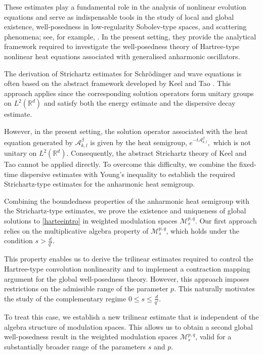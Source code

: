 \documentclass[12pt,reqno,a4paper]{amsart}
\numberwithin{equation}{section}
\theoremstyle{plain}
\theoremstyle{definition}
\theoremstyle{remark}
\def\M{\mathcal{M}}
\def \Ad{\mathcal{A}_{k,l}}
\def \M{{\mathcal M}}
\begin{document}
These estimates play a fundamental role in the analysis of nonlinear evolution equations and serve as indispensable tools in the study of local and global existence, well-posedness in low-regularity Sobolev-type spaces, and scattering phenomena; see, for example, \cite{MR2257393, MR1778778, MR2195116}. In the present setting, they provide the analytical framework required to investigate the well-posedness theory of Hartree-type nonlinear heat equations associated with generalised anharmonic oscillators.

The derivation of Strichartz estimates for Schr\"odinger and wave equations is often based on the abstract framework developed by Keel and Tao \cite{MR1646048}. This approach applies since the corresponding solution operators form unitary groups on $L^{2}(\mathbb{R}^{d})$ and satisfy both the energy estimate and the dispersive decay estimate.

However, in the present setting, the solution operator associated with the heat equation generated by $\Ad^{\beta}$ is given by the heat semigroup, $e^{-t\Ad^{\beta}},$ which is not unitary on $L^{2}(\mathbb{R}^{d})$. Consequently, the abstract Strichartz theory of Keel and Tao cannot be applied directly. To overcome this difficulty, we combine the fixed-time dispersive estimates with Young's inequality to establish the required Strichartz-type estimates for the anharmonic heat semigroup.

Combining the boundedness properties of the anharmonic heat semigroup with the Strichartz-type estimates, we prove the existence and uniqueness of global solutions to \eqref{harteeintro} in weighted modulation spaces \(\M^{p,q}_{s}\). Our first approach relies on the multiplicative algebra property of \(\M^{p,q}_{s}\), which holds under the condition
$s>\frac{d}{q'}.$

This property enables us to derive the trilinear estimates required to control the Hartree-type convolution nonlinearity and to implement a contraction mapping argument for the global well-posedness theory. However, this approach imposes restrictions on the admissible range of the parameter \(p\). This naturally motivates the study of the complementary regime
$0\leq s\leq \frac{d}{q'}.$

To treat this case, we establish a new trilinear estimate that is independent of the algebra structure of modulation spaces. This allows us to obtain a second global well-posedness result in the weighted modulation spaces \(\M^{p,q}_{s}\), valid for a substantially broader range of the parameters \(s\) and \(p\).
\end{document}
